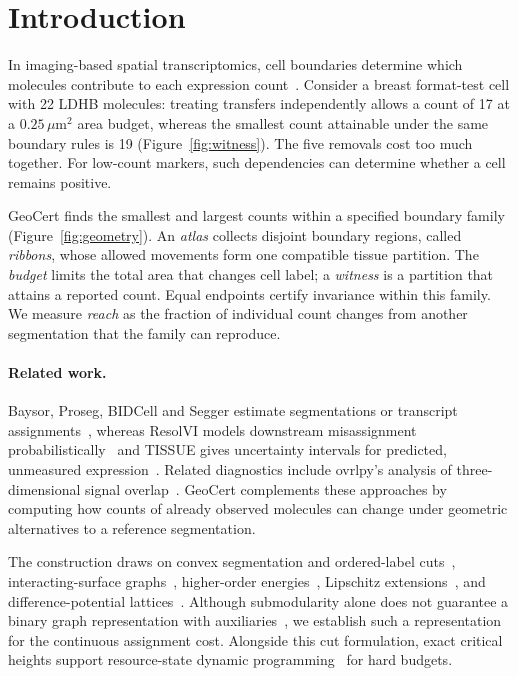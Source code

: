 \documentclass[10pt,letterpaper]{article}
\begin{document}
\section{Introduction}
In imaging-based spatial transcriptomics, cell boundaries determine which molecules contribute to each expression count~\cite{baysor,proseg}. Consider a breast format-test cell with 22 LDHB molecules: treating transfers independently allows a count of 17 at a $0.25\,\mu\mathrm m^2$ area budget, whereas the smallest count attainable under the same boundary rules is 19 (Figure~\ref{fig:witness}). The five removals cost too much together. For low-count markers, such dependencies can determine whether a cell remains positive.

GeoCert finds the smallest and largest counts within a specified boundary family (Figure~\ref{fig:geometry}). An \emph{atlas} collects disjoint boundary regions, called \emph{ribbons}, whose allowed movements form one compatible tissue partition. The \emph{budget} limits the total area that changes cell label; a \emph{witness} is a partition that attains a reported count. Equal endpoints certify invariance within this family. We measure \emph{reach} as the fraction of individual count changes from another segmentation that the family can reproduce.

\paragraph{Related work.}
Baysor, Proseg, BIDCell and Segger estimate segmentations or transcript assignments~\cite{baysor,proseg,bidcell,segger}, whereas ResolVI models downstream misassignment probabilistically~\cite{resolvi} and TISSUE gives uncertainty intervals for predicted, unmeasured expression~\cite{tissue}. Related diagnostics include ovrlpy's analysis of three-dimensional signal overlap~\cite{ovrlpy}. GeoCert complements these approaches by computing how counts of already observed molecules can change under geometric alternatives to a reference segmentation.

The construction draws on convex segmentation and ordered-label cuts~\cite{hochbaum,ishikawa}, interacting-surface graphs~\cite{li,shah}, higher-order energies~\cite{kz,kohli}, Lipschitz extensions~\cite{mcshane,whitney}, and difference-potential lattices~\cite{felsner}. Although submodularity alone does not guarantee a binary graph representation with auxiliaries~\cite{zivny}, we establish such a representation for the continuous assignment cost. Alongside this cut formulation, exact critical heights support resource-state dynamic programming~\cite{joksch} for hard budgets.
\end{document}
